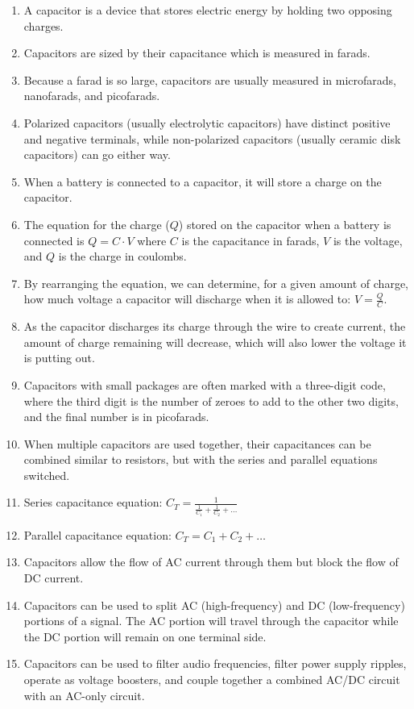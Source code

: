 \begin{enumerate}
\item A capacitor is a device that stores electric energy by holding two opposing charges.
\item Capacitors are sized by their capacitance which is measured in farads.
\item Because a farad is so large, capacitors are usually measured in microfarads, nanofarads, and picofarads.
\item Polarized capacitors (usually electrolytic capacitors) have distinct positive and negative terminals, while non-polarized capacitors (usually ceramic disk capacitors) can go either way.
\item When a battery is connected to a capacitor, it will store a charge on the capacitor.
\item The equation for the charge ($Q$) stored on the capacitor when a battery is connected is $Q = C\cdot V$ where $C$ is the capacitance in farads, $V$ is the voltage, and $Q$ is the charge in coulombs.
\item By rearranging the equation, we can determine, for a given amount of charge, how much voltage a capacitor will discharge when it is allowed to: $V = \frac{Q}{C}$.
\item As the capacitor discharges its charge through the wire to create current, the amount of charge remaining will decrease, which will also lower the voltage it is putting out.
\item Capacitors with small packages are often marked with a three-digit code, where the third digit is the number of zeroes to add to the other two digits, and the final number is in picofarads.
\item When multiple capacitors are used together, their capacitances can be combined similar to resistors, but with the series and parallel equations switched.
\item Series capacitance equation: $C_T = \frac{1}{\frac{1}{C_1} + \frac{1}{C_2} + \ldots}$
\item Parallel capacitance equation: $C_T = C_1 + C_2 + \ldots$
\item Capacitors allow the flow of AC current through them but block the flow of DC current.
\item Capacitors can be used to split AC (high-frequency) and DC (low-frequency) portions of a signal.  The AC portion will travel through the capacitor while the DC portion will remain on one terminal side.
\item Capacitors can be used to filter audio frequencies, filter power supply ripples, operate as voltage boosters, and couple together a combined AC/DC circuit with an AC-only circuit.
\end{enumerate}

